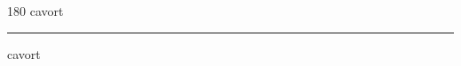 
\begin{frame}
\begin{center}
\begin{turn}{180}
{\fontsize{2.5cm}{1em}\selectfont cavort}
\end{turn}
\vspace{1em}\par  
\hrule
\vspace{1em}\par  
{\fontsize{2.5cm}{1em}\selectfont cavort}
\end{center}
\end{frame}
